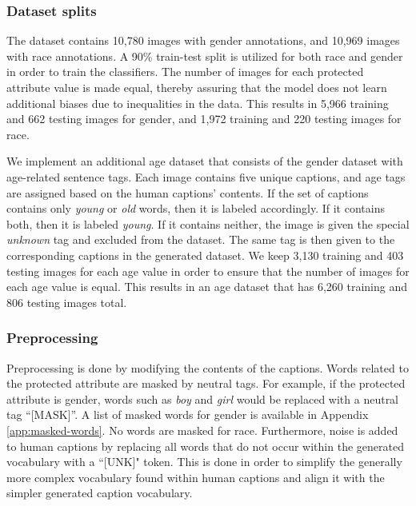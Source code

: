 
\subsubsection{Dataset splits} The dataset contains 10,780 images with gender annotations, and 10,969 images with race annotations.
A 90\% train-test split is utilized for both race and gender in order to train the classifiers.
The number of images for each protected attribute value is made equal, thereby assuring that the model does not learn additional biases due to inequalities in the data. This results in 5,966 training and 662 testing images for gender, and 1,972 training and 220 testing images for race.
 
We implement an additional age dataset that consists of the gender dataset with age-related sentence tags. 
Each image contains five unique captions, and age tags are assigned based on the human captions' contents. If the set of captions contains only \textit{young} or \textit{old} words, then it is labeled accordingly. If it contains both, then it is labeled \textit{young}. If it contains neither, the image is given the special \textit{unknown} tag and excluded from the dataset. 
The same tag is then given to the corresponding captions in the generated dataset.
%
We keep 3,130 training and 403 testing images for each age value in order to ensure that the number of images for each age value is equal. This results in an age dataset that has 6,260 training and 806 testing images total.

\subsubsection{Preprocessing} \label{sec:preprocessing}
Preprocessing is done by modifying the contents of the captions. Words related to the protected attribute are masked by neutral tags. For example, if the protected attribute is gender, words such as \textit{boy} and \textit{girl} would be replaced with a neutral tag ``[MASK]''. A list of masked words for gender is available in Appendix \ref{app:masked-words}. No words are masked for race.
Furthermore, noise is added to human captions by replacing all words that do not occur within the generated vocabulary with a ``[UNK]" token. This is done in order to simplify the generally more complex vocabulary found within human captions and align it with the simpler generated caption vocabulary.

